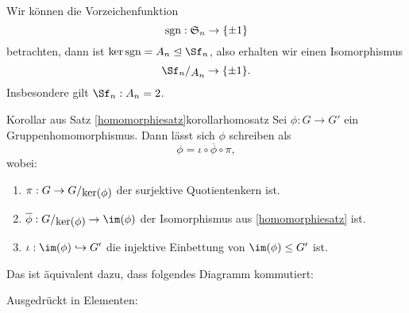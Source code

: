 \begin{beispiel}
Wir können die Vorzeichenfunktion 
\begin{equation}
\text{sgn}: \mathfrak{S}_n \to \{\pm 1\}
\end{equation}
betrachten, dann ist $\ker{\sgn} = A_n \trianglelefteq \Sf_n$, also erhalten wir einen Isomorphismus 
\begin{equation}
\quotient{\Sf_n}{A_n} \to \{ \pm 1\}.
\end{equation}
Insbesondere gilt $\Sf_n : A_n = 2$.
\end{beispiel}
\begin{korollar}{Korollar aus Satz \ref{homomorphiesatz}}{korollarhomosatz}
Sei $\phi: G \to G'$ ein Gruppenhomomorphismus. Dann lässt sich $\phi$ schreiben als
\begin{equation}
\phi = \iota \circ \overline{\phi} \circ \pi,
\end{equation}
wobei:
\begin{enumerate}
\item $\pi:G \to \quotient{G}{\ker (\phi)}$ der surjektive Quotientenkern ist.
\item $\overline{\phi}: \quotient{G}{\ker (\phi)} \to \im (\phi)$ der Isomorphismus aus \ref{homomorphiesatz} ist.
\item $\iota: \im (\phi) \hookrightarrow G'$ die injektive Einbettung von $\im (\phi) \leq G'$ ist.
\end{enumerate}
Das ist äquivalent dazu, dass folgendes Diagramm kommutiert:
\begin{center}
\end{center}
Ausgedrückt in Elementen:
\begin{center}
\end{center}
\end{korollar}
